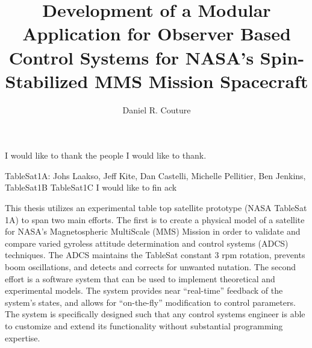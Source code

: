 \documentclass[11pt,doublespace]{unhthesis}
\begin{document}
\title{Development of a Modular Application for Observer Based Control Systems for NASA's Spin-Stabilized MMS Mission Spacecraft}
\author{Daniel R. Couture}
\maketitle

\makecopyright

\makeapproval

\begin{dedication}
  I would like to thank the people I would like to thank.
\end{dedication}

\begin{acknowledgments}
  TableSat1A: Johs Laakso, Jeff Kite, Dan Castelli, Michelle Pellitier, Ben Jenkins,
  TableSat1B
  TableSat1C
    I would like to fin ack
\end{acknowledgments}

\begin{singlespace}
  \tableofcontents
  \listoftables
  \listoffigures
\end{singlespace}

\begin{abstractpage}
This thesis utilizes an experimental table top satellite prototype (NASA TableSat 1A) to span two main efforts.  The first is to create a physical model of a satellite for NASA's Magnetospheric MultiScale (MMS) Mission in order to validate and compare varied gyroless attitude determination and control systems (ADCS) techniques.  The ADCS maintains the TableSat constant 3 rpm rotation, prevents boom oscillations, and detects and corrects for unwanted nutation.  The second effort is a software system that can be used to implement theoretical and experimental models.  The system provides near ``real-time'' feedback of the system's states, and allows for ``on-the-fly'' modification to control parameters.  The system is specifically designed such that any control systems engineer is able to customize and extend its functionality without substantial programming expertise.
\end{abstractpage}
\end{document}
